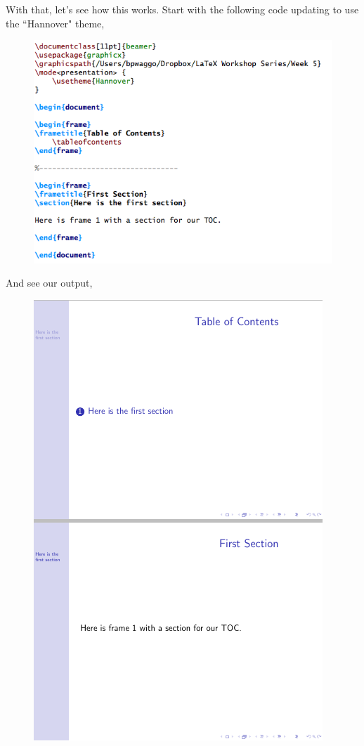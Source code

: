 \documentclass[11pt]{article}
\begin{document}
With that, let's see how this works. Start with the following code updating to use the ``Hannover" theme,

\begin{figure}[!h]
	\includegraphics[scale=.5]{CODE5}
	\centering
\end{figure}

And see our output,

\begin{figure}[!h]
	\includegraphics[scale=.5]{OUT5}
	\centering
\end{figure}
\end{document}
